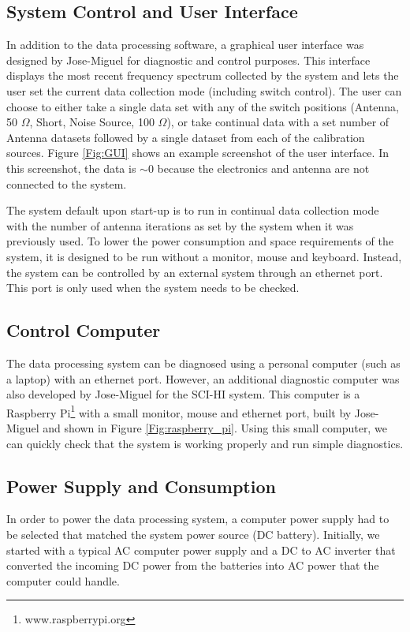\subsection{System Control and User Interface}
In addition to the data processing software, a graphical user interface was designed by Jose-Miguel for diagnostic and control purposes. This interface displays the most recent frequency spectrum collected by the system and lets the user set the current data collection mode (including switch control). The user can choose to either take a single data set with any of the switch positions (Antenna, 50 $\Omega$, Short, Noise Source, 100 $\Omega$), or take continual data with a set number of Antenna datasets followed by a single dataset from each of the calibration sources. Figure \ref{Fig:GUI} shows an example screenshot of the user interface. In this screenshot, the data is $\sim0$ because the electronics and antenna are not connected to the system. 

The system default upon start-up is to run in continual data collection mode with the number of antenna iterations as set by the system when it was previously used. To lower the power consumption and space requirements of the system, it is designed to be run without a monitor, mouse and keyboard. Instead, the system can be controlled by an external system through an ethernet port. This port is only used when the system needs to be checked.

\subsection{Control Computer}
The data processing system can be diagnosed using a personal computer (such as a laptop) with an ethernet port. However, an additional diagnostic computer was also developed by Jose-Miguel for the SCI-HI system. This computer is a Raspberry Pi\footnote{www.raspberrypi.org} with a small monitor, mouse and ethernet port, built by Jose-Miguel and shown in Figure \ref{Fig:raspberry_pi}. Using this small computer, we can quickly check that the system is working properly and run simple diagnostics.

\subsection{Power Supply and Consumption}
In order to power the data processing system, a computer power supply had to be selected that matched the system power source (DC battery). Initially, we started with a typical AC computer power supply and a DC to AC inverter that converted the incoming DC power from the batteries into AC power that the computer could handle. 

